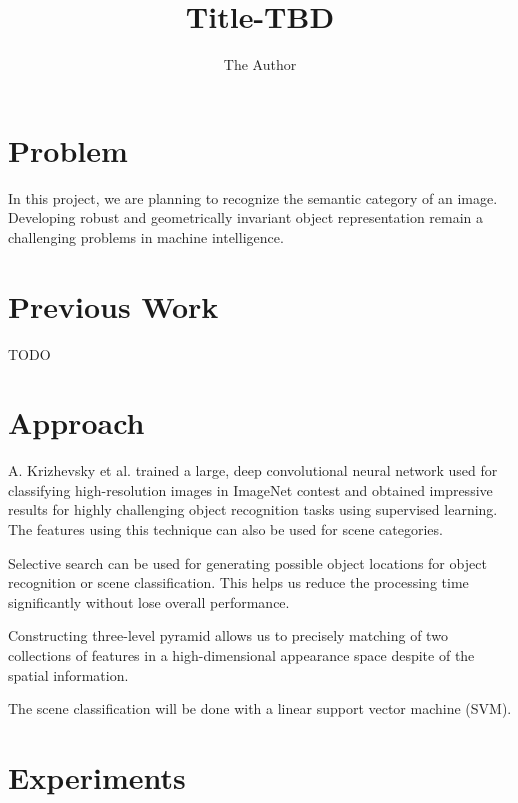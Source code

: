 \documentclass[letterpaper,twocolumn,11pt]{article}
\title{Title-TBD}
\author{The Author}
\date{} %
\begin{document}
\maketitle

\section{Problem}
	In this project, we are planning to recognize the semantic category of an
	image. Developing robust and geometrically invariant object representation
	remain a challenging problems in machine intelligence.

\section{Previous Work}
TODO

\section{Approach}
\par
	A. Krizhevsky et al.\cite{CNN} trained a large, deep convolutional neural network used for classifying high-resolution images in ImageNet contest
	and obtained impressive results for highly challenging object recognition
	tasks using	supervised learning. The features using this technique can also
	be used	for scene categories.

\par
	Selective search\cite{SS} can be used for generating possible object
	locations for object recognition or scene classification. This helps us
	reduce the processing time significantly without lose overall performance.

\par
	Constructing three-level pyramid allows us to precisely matching of two
	collections of features in a high-dimensional appearance space despite
	of the spatial information.\cite{SPM}

\par
	The scene classification will be done with a linear support vector machine
	(SVM).\cite{SVM}

\section{Experiments}
\end{document}
